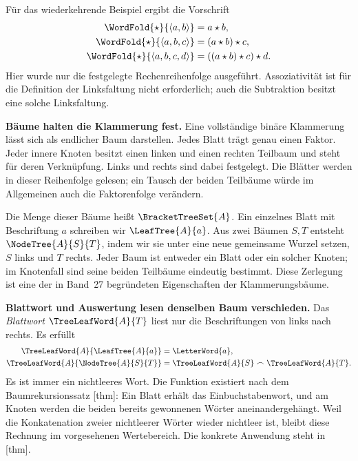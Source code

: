 Für das wiederkehrende Beispiel ergibt die Vorschrift
\[
  \begin{aligned}
    \WordFold{\star}{\langle a,b\rangle}&=a\star b,\\
    \WordFold{\star}{\langle a,b,c\rangle}&=(a\star b)\star c,\\
    \WordFold{\star}{\langle a,b,c,d\rangle}
      &=((a\star b)\star c)\star d.
  \end{aligned}
\]
Hier wurde nur die festgelegte Rechenreihenfolge ausgeführt.
Assoziativität ist für die Definition der Linksfaltung nicht erforderlich;
auch die Subtraktion besitzt eine solche Linksfaltung.

\medskip\noindent\textbf{Bäume halten die Klammerung fest.}
Eine vollständige binäre Klammerung lässt sich als endlicher Baum
darstellen. Jedes Blatt trägt genau einen Faktor. Jeder innere Knoten
besitzt einen linken und einen rechten Teilbaum und steht für deren
Verknüpfung. Links und rechts sind dabei festgelegt. Die Blätter werden
in dieser Reihenfolge gelesen; ein Tausch der beiden Teilbäume würde
im Allgemeinen auch die Faktorenfolge verändern.

Die Menge dieser Bäume heißt \(\BracketTreeSet{A}\).
Ein einzelnes Blatt mit Beschriftung \(a\) schreiben wir
\(\LeafTree{A}{a}\). Aus zwei Bäumen \(S,T\) entsteht
\(\NodeTree{A}{S}{T}\), indem wir sie unter eine neue gemeinsame
Wurzel setzen, \(S\) links und \(T\) rechts. Jeder Baum ist entweder
ein Blatt oder ein solcher Knoten; im Knotenfall sind seine beiden
Teilbäume eindeutig bestimmt. Diese Zerlegung ist eine der in Band~27
begründeten Eigenschaften der Klammerungsbäume.

\BracketingTreesDiagram

\medskip\noindent\textbf{Blattwort und Auswertung lesen denselben Baum verschieden.}
Das \emph{Blattwort} \(\TreeLeafWord{A}{T}\) liest nur die
Beschriftungen von links nach rechts. Es erfüllt
\[
  \begin{aligned}
    \TreeLeafWord{A}{\LeafTree{A}{a}}&=\LetterWord{a},\\
    \TreeLeafWord{A}{\NodeTree{A}{S}{T}}
      &=\TreeLeafWord{A}{S}\frown\TreeLeafWord{A}{T}.
  \end{aligned}
\]
Es ist immer ein nichtleeres Wort. Die Funktion existiert nach dem
Baumrekursionssatz [thm]:
Ein Blatt erhält das Einbuchstabenwort, und am Knoten werden die beiden
bereits gewonnenen Wörter aneinandergehängt. Weil die Konkatenation
zweier nichtleerer Wörter wieder nichtleer ist, bleibt diese Rechnung
im vorgesehenen Wertebereich. Die konkrete Anwendung steht in
[thm].

